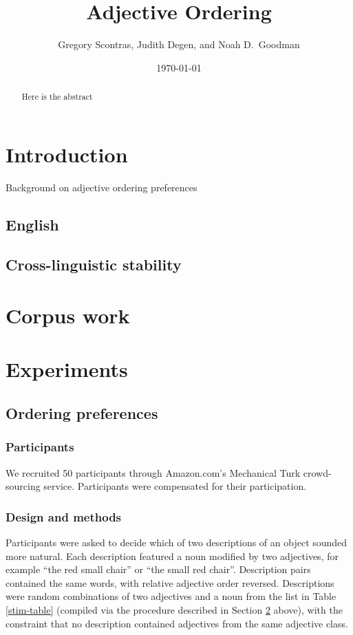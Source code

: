 \documentclass[11pt]{article}
\title{Adjective Ordering}
\author{Gregory Scontras, Judith Degen, and Noah D.~Goodman}
\date{\today}
\begin{document}
\thispagestyle{plain}

\maketitle

\begin{abstract}
	Here is the abstract
\end{abstract}


\section{Introduction}

Background on adjective ordering preferences

\subsection{English}

\subsection{Cross-linguistic stability}


\section{Corpus work} \label{corpus}


\section{Experiments}

\subsection{Ordering preferences}

\subsubsection{Participants}

We recruited 50 participants through Amazon.com's Mechanical Turk crowd-sourcing service. Participants were compensated for their participation.

\subsubsection{Design and methods}

Participants were asked to decide which of two descriptions of an object sounded more natural. Each description featured a noun modified by two adjectives, for example ``the red small chair'' or ``the small red chair''. Description pairs contained the same words, with relative adjective order reversed. Descriptions were random combinations of two adjectives and a noun from the list in Table \ref{stim-table} (compiled via the procedure described in Section \ref{corpus} above), with the constraint that no description contained adjectives from the same adjective class.
\end{document}
